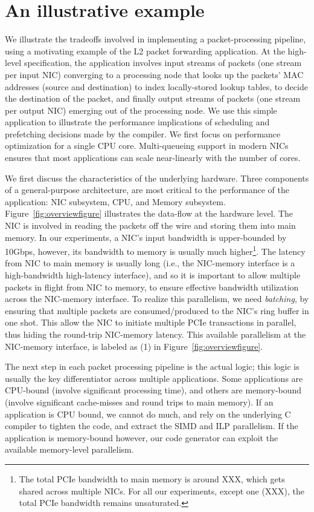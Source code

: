 \section{An illustrative example}
\label{Buildingblocks}
We illustrate the tradeoffs involved in implementing a packet-processing
pipeline, using a motivating example of the L2 packet forwarding application.
At the high-level specification, the application involves input streams
of packets (one stream per input NIC) converging
to a processing node that looks up the packets' MAC addresses (source
and destination)
to index locally-stored lookup tables, to decide the destination of the packet, and
finally output streams of packets (one stream per output NIC) emerging out of
the processing node. We use
this simple application to illustrate the performance implications of
scheduling and prefetching decisions made by the compiler. We first focus on performance
optimization for a single CPU core. Multi-queueing support in modern NICs
ensures that most applications can scale near-linearly with the number of cores.

We first discuss the characteristics of the underlying hardware.
Three components of a general-purpose architecture, are most critical to the performance of the
application: NIC subsystem, CPU, and Memory subsystem. Figure~\ref{fig:overviewfigure}
illustrates the data-flow at the hardware level. The NIC is involved in reading the packets
off the wire and storing them into main memory. In our experiments, a NIC's input bandwidth
is upper-bounded by 10Gbps, however, its bandwidth to memory is usually much higher\footnote{The
total PCIe bandwidth to main memory is around XXX, which gets shared across multiple NICs. For
all our experiments, except one (XXX), the total PCIe bandwidth remains unsaturated.}. The latency
from NIC to main memory is usually long (i.e., the NIC-memory interface is a high-bandwidth
high-latency interface), and so it is important to allow multiple
packets in flight from NIC to memory, to ensure effective bandwidth utilization across the
NIC-memory interface. To realize this parallelism, we need {\em batching}, by ensuring
that multiple
packets are consumed/produced to the NIC's ring buffer in one shot. This allow the NIC to initiate
multiple PCIe transactions in parallel, thus hiding the round-trip NIC-memory latency. This
available parallelism at the NIC-memory interface, is labeled as (1) %
in Figure~\ref{fig:overviewfigure}.

The next step in each packet processing pipeline is the actual logic; this logic is usually
the key differentiator across multiple applications. Some applications are CPU-bound (involve
significant processing time), and others are memory-bound (involve significant cache-misses
and round trips to main memory). If an application is CPU bound, we cannot do much, and rely
on the underlying C compiler to tighten the code, and extract the SIMD and ILP parallelism. If
the application is memory-bound however, our code generator can exploit the
available memory-level parallelism.

